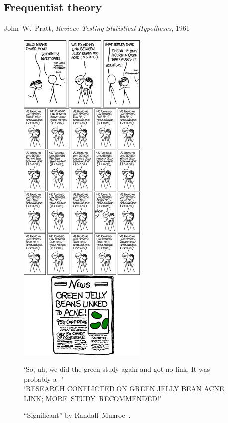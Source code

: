 \begin{singlespacing}
\section{Frequentist theory}
\label{sec:searches_frequentist}
\begin{epigraphs}
%
{John~W.~Pratt,
\textit{Review: Testing Statistical Hypotheses},
1961~\cite{pratt1961testing}}
\end{epigraphs}
\end{singlespacing}

\begin{figure}[tp]
\centering
\includegraphics[width=0.55\textwidth]{figures/searches_significant_shrink.png}
\\
\begin{footnotesize}
`So, uh, we did the green study again and got no link. It was probably a{-}{-}'
\\
`RESEARCH CONFLICTED ON GREEN JELLY BEAN ACNE LINK; MORE~STUDY~RECOMMENDED!'
\end{footnotesize}
\caption[
``Significant'' by Randall~Munroe
]{%
``Significant'' by Randall~Munroe~\cite{xkcd2011significant}.
}
\label{fig:searches_significant}
\end{figure}



